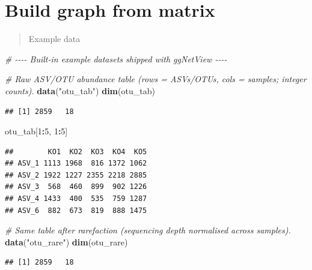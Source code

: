 \documentclass[
]{book}
\newenvironment{Shaded}{\begin{snugshade}}{\end{snugshade}}
\newcommand{\CommentTok}[1]{\textcolor[rgb]{0.56,0.35,0.01}{\textit{#1}}}
\newcommand{\DecValTok}[1]{\textcolor[rgb]{0.00,0.00,0.81}{#1}}
\newcommand{\FunctionTok}[1]{\textcolor[rgb]{0.13,0.29,0.53}{\textbf{#1}}}
\newcommand{\NormalTok}[1]{#1}
\newcommand{\SpecialCharTok}[1]{\textcolor[rgb]{0.81,0.36,0.00}{\textbf{#1}}}
\newcommand{\StringTok}[1]{\textcolor[rgb]{0.31,0.60,0.02}{#1}}
\begin{document}
\section{Build graph from matrix}\label{build-graph-from-matrix}

\begin{quote}
Example data
\end{quote}

\begin{Shaded}
\begin{Highlighting}[]
\CommentTok{\# {-}{-}{-}{-} Built{-}in example datasets shipped with ggNetView {-}{-}{-}{-}}

\CommentTok{\# Raw ASV/OTU abundance table (rows = ASVs/OTUs, cols = samples; integer counts).}
\FunctionTok{data}\NormalTok{(}\StringTok{"otu\_tab"}\NormalTok{)}
\FunctionTok{dim}\NormalTok{(otu\_tab)}
\end{Highlighting}
\end{Shaded}

\begin{verbatim}
## [1] 2859   18
\end{verbatim}

\begin{Shaded}
\begin{Highlighting}[]
\NormalTok{otu\_tab[}\DecValTok{1}\SpecialCharTok{:}\DecValTok{5}\NormalTok{, }\DecValTok{1}\SpecialCharTok{:}\DecValTok{5}\NormalTok{]}
\end{Highlighting}
\end{Shaded}

\begin{verbatim}
##        KO1  KO2  KO3  KO4  KO5
## ASV_1 1113 1968  816 1372 1062
## ASV_2 1922 1227 2355 2218 2885
## ASV_3  568  460  899  902 1226
## ASV_4 1433  400  535  759 1287
## ASV_6  882  673  819  888 1475
\end{verbatim}

\begin{Shaded}
\begin{Highlighting}[]
\CommentTok{\# Same table after rarefaction (sequencing depth normalised across samples).}
\FunctionTok{data}\NormalTok{(}\StringTok{"otu\_rare"}\NormalTok{)}
\FunctionTok{dim}\NormalTok{(otu\_rare)}
\end{Highlighting}
\end{Shaded}

\begin{verbatim}
## [1] 2859   18
\end{verbatim}
\end{document}
